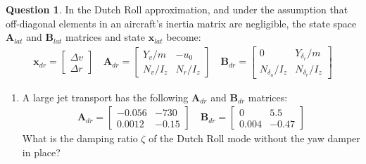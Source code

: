 \documentclass{article}
\theoremstyle{definition}
\newtheorem{question}{Question}
\begin{document}
\vspace{0.1cm}
\clearpage

\vspace{6cm}

\begin{question}
    In the Dutch Roll approximation, and under the assumption that off-diagonal elements in an aircraft's inertia matrix are negligible, the state space $\mathbf{A}_{lat}$ and $\mathbf{B}_{lat}$ matrices and state $\mathbf{x}_{lat}$ become:
    \begin{align*}
        \mathbf{x}_{dr} =
        \begin{bmatrix}
            \Delta v \\
            \Delta r
        \end{bmatrix}
        \quad
        \mathbf{A}_{dr} = 
        \begin{bmatrix}
            Y_v/m & -u_0 \\
            N_v/I_z & N_r/I_z
        \end{bmatrix}
        \quad
        \mathbf{B}_{dr} =
        \begin{bmatrix}
            0 & Y_{\delta_r}/m \\
            N_{\delta_a}/I_z & N_{\delta_r}/I_z
        \end{bmatrix}
    \end{align*}
    \begin{enumerate}[label=\alph*)]

        \item A large jet transport has the following $\mathbf{A}_{dr}$ and $\mathbf{B}_{dr}$ matrices:
        \begin{align*}
            \mathbf{A}_{dr} = 
            \begin{bmatrix}
                -0.056 & -730 \\
                0.0012 & -0.15
            \end{bmatrix}
            \quad
            \mathbf{B}_{dr} =
            \begin{bmatrix}
                0 & 5.5 \\
                0.004 & -0.47
            \end{bmatrix}
        \end{align*}
        What is the damping ratio $\zeta$ of the Dutch Roll mode without the yaw damper in place?


\end{enumerate}
\end{question}
\end{document}
